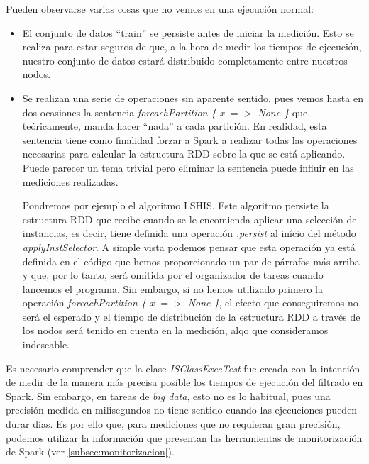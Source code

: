 Pueden observarse varias cosas que no vemos en una ejecución normal:
\begin{itemize}
	\item El conjunto de datos ``train'' se persiste antes de iniciar la medición. Esto se realiza para estar seguros de que, a la hora de medir los tiempos de ejecución, nuestro conjunto de datos estará distribuido completamente entre nuestros nodos.
	\item Se realizan una serie de operaciones sin aparente sentido, pues vemos hasta en dos ocasiones la sentencia \textit{foreachPartition \{ x $=>$ None \}} que, teóricamente, manda hacer ``nada'' a cada partición. En realidad, esta sentencia tiene como finalidad forzar a Spark a realizar todas las operaciones necesarias para calcular la estructura RDD sobre la que se está aplicando. Puede parecer un tema trivial pero eliminar la sentencia puede influir en las mediciones realizadas.
	
	Pondremos por ejemplo el algoritmo LSHIS. Este algoritmo persiste la estructura RDD que recibe cuando se le encomienda aplicar una selección de instancias, es decir, tiene definida una operación \textit{.persist} al início del método \textit{applyInstSelector}. A simple vista podemos pensar que esta operación ya está definida en el código que hemos proporcionado un par de párrafos más arriba y que, por lo tanto, será omitida por el organizador de tareas cuando lancemos el programa. Sin embargo, si no hemos utilizado primero la operación \textit{foreachPartition \{ x $=>$ None \}}, el efecto que conseguiremos no será el esperado y el tiempo de distribución de la estructura RDD a través de los nodos será tenido en cuenta en la medición, alqo que consideramos indeseable.
\end{itemize}


Es necesario comprender que la clase \textit{ISClassExecTest} fue creada con la intención de medir de la manera más precisa posible los tiempos de ejecución del filtrado en Spark. Sin embargo, en tareas de \textit{big data}, esto no es lo habitual, pues una precisión medida en milisegundos no tiene sentido cuando las ejecuciones pueden durar días. Es por ello que, para mediciones que no requieran gran precisión, podemos utilizar la información que presentan las herramientas de monitorización de Spark (ver \ref{subsec:monitorizacion}).
